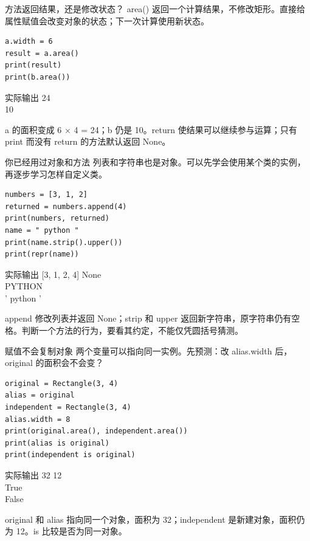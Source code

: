 \documentclass[9pt]{ctexbeamer}
\begin{document}
\begin{frame}[fragile]{方法返回结果，还是修改状态？}
area() 返回一个计算结果，不修改矩形。直接给属性赋值会改变对象的状态；下一次计算使用新状态。
\begin{lstlisting}
a.width = 6
result = a.area()
print(result)
print(b.area())
\end{lstlisting}
\begin{exampleblock}{实际输出}
{\ttfamily\small 24\\
10}
\end{exampleblock}
\small a 的面积变成 6 × 4 = 24；b 仍是 10。return 使结果可以继续参与运算；只有 print 而没有 return 的方法默认返回 None。
\par{}

\end{frame}

\begin{frame}[fragile]{你已经用过对象和方法}
列表和字符串也是对象。可以先学会使用某个类的实例，再逐步学习怎样自定义类。
\begin{lstlisting}
numbers = [3, 1, 2]
returned = numbers.append(4)
print(numbers, returned)
name = " python "
print(name.strip().upper())
print(repr(name))
\end{lstlisting}
\begin{exampleblock}{实际输出}
{\ttfamily\small [3, 1, 2, 4] None\\
PYTHON\\
' python '}
\end{exampleblock}
\small append 修改列表并返回 None；strip 和 upper 返回新字符串，原字符串仍有空格。判断一个方法的行为，要看其约定，不能仅凭圆括号猜测。
\par{}

\end{frame}

\begin{frame}[fragile]{赋值不会复制对象}
两个变量可以指向同一实例。先预测：改 alias.width 后，original 的面积会不会变？
\begin{lstlisting}
original = Rectangle(3, 4)
alias = original
independent = Rectangle(3, 4)
alias.width = 8
print(original.area(), independent.area())
print(alias is original)
print(independent is original)
\end{lstlisting}
\begin{exampleblock}{实际输出}
{\ttfamily\small 32 12\\
True\\
False}
\end{exampleblock}
\small original 和 alias 指向同一个对象，面积为 32；independent 是新建对象，面积仍为 12。is 比较是否为同一对象。
\par{}

\end{frame}
\end{document}
